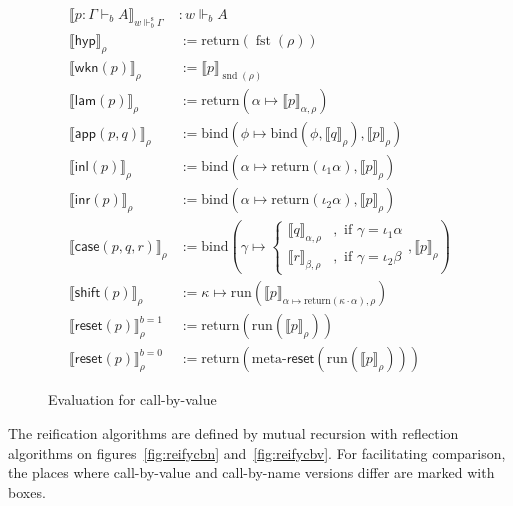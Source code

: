 \documentclass{eptcs}
\newcommand{\hyp}{\mathsf{hyp}}
\newcommand{\wkn}[1]{\mathsf{wkn}{(#1)}}
\newcommand{\inl}[1]{\mathsf{inl}{(#1)}}
\newcommand{\inr}[1]{\mathsf{inr}{(#1)}}
\newcommand{\lam}[1]{\mathsf{lam}{(#1)}}
\newcommand{\reset}[1]{\mathsf{reset}{(#1)}}
\newcommand{\shift}[1]{\mathsf{shift}{(#1)}}
\newcommand{\casemy}[3]{\mathsf{case}({#1},{#2},{#3})}
\newcommand{\app}[2]{\mathsf{app}({#1},{#2})}
\DeclareMathOperator{\Fst}{fst}
\DeclareMathOperator{\Snd}{snd}
\newcommand{\forces}[3]{{#1}\Vdash_{#2}{#3}}
\newcommand{\sforces}[3]{{#1}\Vdash^{\text{s}}_{#2}{#3}}
\newcommand{\run}[1]{\text{run}{(#1)}}
\newcommand{\ret}[1]{\text{return}{(#1)}}
\newcommand{\bind}[2]{\text{bind}{(#1,#2)}}
\newcommand{\eval}[2]{\llbracket{#1}\rrbracket_{#2}}
\theoremstyle{definition}
\theoremstyle{plain}
\theoremstyle{remark}
\begin{document}
\begin{figure*}
\centering
  \begin{align*}
    \eval{p : \Gamma\vdash_b A}{\sforces{w}{b}{\Gamma}} &: \forces{w}{b}{A}\\
    \eval{\hyp}{\rho} &:= \ret{\Fst(\rho)}\\
    \eval{\wkn{p}}{\rho} &:= \eval{p}{\Snd(\rho)}\\
    \eval{\lam{p}}{\rho} &:= \ret{\alpha\mapsto\eval{p}{\alpha,\rho}}\\
    \eval{\app{p}{q}}{\rho} &:= \bind{\phi\mapsto\bind{\phi}{\eval{q}{\rho}}}{\eval{p}{\rho}}\\
    \eval{\inl{p}}{\rho} &:= \bind{\alpha\mapsto\ret{\iota_1\alpha}}{\eval{p}{\rho}}\\
    \eval{\inr{p}}{\rho} &:= \bind{\alpha\mapsto\ret{\iota_2\alpha}}{\eval{p}{\rho}}\\
    \eval{\casemy{p}{q}{r}}{\rho} &:= \bind{\gamma\mapsto \left\{ 
      \begin{array}{ll}
        \eval{q}{\alpha,\rho} & ,\text{ if } \gamma=\iota_1\alpha\\
        \eval{r}{\beta,\rho} & ,\text{ if } \gamma=\iota_2\beta
      \end{array}        
      \right.}{\eval{p}{\rho}}\\
    \eval{\shift{p}}{\rho} &:= \kappa\mapsto\run{\eval{p}{{\alpha\mapsto\ret{\kappa\cdot\alpha}},\rho}}\\
    \eval{\reset{p}}{\rho}^{b=1} &:=\ret{\run{\eval{p}{\rho}}}\\
    \eval{\reset{p}}{\rho}^{b=0} &:=\ret{\text{meta-}\reset{\run{\eval{p}{\rho}}}}
  \end{align*}  
  \caption{Evaluation for call-by-value}
  \label{fig:evalcbv}
\end{figure*}

The reification algorithms are defined by mutual recursion with reflection algorithms on figures~\ref{fig:reifycbn} and~\ref{fig:reifycbv}. For facilitating comparison, the places where call-by-value and call-by-name versions differ are marked with boxes.
\end{document}
